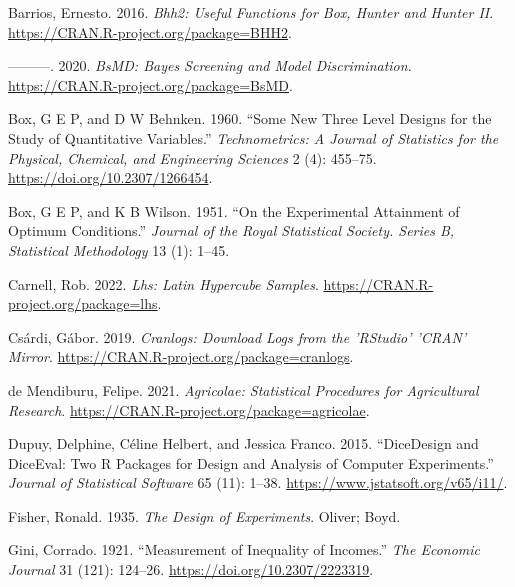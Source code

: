 \documentclass{article}
\newlength{\cslhangindent}
\newlength{\cslentryspacingunit} %
\newenvironment{CSLReferences}[2] %
 {%
  \setlength{\parindent}{0pt}
  \ifodd #1
  \let\oldpar\par
  \def\par{\hangindent=\cslhangindent\oldpar}
  \fi
  \setlength{\parskip}{#2\cslentryspacingunit}
 }%
 {}
\begin{document}
\hypertarget{refs}{}
\begin{CSLReferences}{1}{0}
\leavevmode{}%
Barrios, Ernesto. 2016. \emph{Bhh2: Useful Functions for Box, Hunter and
Hunter II}. \url{https://CRAN.R-project.org/package=BHH2}.

\leavevmode{}%
---------. 2020. \emph{BsMD: Bayes Screening and Model Discrimination}.
\url{https://CRAN.R-project.org/package=BsMD}.

\leavevmode{}%
Box, G E P, and D W Behnken. 1960. {``Some New Three Level Designs for
the Study of Quantitative Variables.''} \emph{Technometrics: A Journal
of Statistics for the Physical, Chemical, and Engineering Sciences} 2
(4): 455--75. \url{https://doi.org/10.2307/1266454}.

\leavevmode{}%
Box, G E P, and K B Wilson. 1951. {``On the Experimental Attainment of
Optimum Conditions.''} \emph{Journal of the Royal Statistical Society.
Series B, Statistical Methodology} 13 (1): 1--45.

\leavevmode{}%
Carnell, Rob. 2022. \emph{Lhs: Latin Hypercube Samples}.
\url{https://CRAN.R-project.org/package=lhs}.

\leavevmode{}%
Csárdi, Gábor. 2019. \emph{Cranlogs: Download Logs from the 'RStudio'
'CRAN' Mirror}. \url{https://CRAN.R-project.org/package=cranlogs}.

\leavevmode{}%
de Mendiburu, Felipe. 2021. \emph{Agricolae: Statistical Procedures for
Agricultural Research}.
\url{https://CRAN.R-project.org/package=agricolae}.

\leavevmode{}%
Dupuy, Delphine, Céline Helbert, and Jessica Franco. 2015.
{``{DiceDesign} and {DiceEval}: Two {R} Packages for Design and Analysis
of Computer Experiments.''} \emph{Journal of Statistical Software} 65
(11): 1--38. \url{https://www.jstatsoft.org/v65/i11/}.

\leavevmode{}%
Fisher, Ronald. 1935. \emph{The Design of Experiments}. Oliver; Boyd.

\leavevmode{}%
Gini, Corrado. 1921. {``Measurement of Inequality of Incomes.''}
\emph{The Economic Journal} 31 (121): 124--26.
\url{https://doi.org/10.2307/2223319}.


\end{CSLReferences}
\end{document}
